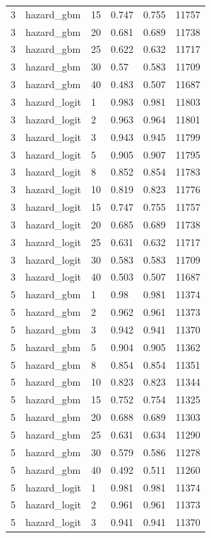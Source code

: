 \begin{tabular}{llllll}
3 & hazard\_gbm & 15 & 0.747 & 0.755 & 11757 \\
3 & hazard\_gbm & 20 & 0.681 & 0.689 & 11738 \\
3 & hazard\_gbm & 25 & 0.622 & 0.632 & 11717 \\
3 & hazard\_gbm & 30 & 0.57 & 0.583 & 11709 \\
3 & hazard\_gbm & 40 & 0.483 & 0.507 & 11687 \\
3 & hazard\_logit & 1 & 0.983 & 0.981 & 11803 \\
3 & hazard\_logit & 2 & 0.963 & 0.964 & 11801 \\
3 & hazard\_logit & 3 & 0.943 & 0.945 & 11799 \\
3 & hazard\_logit & 5 & 0.905 & 0.907 & 11795 \\
3 & hazard\_logit & 8 & 0.852 & 0.854 & 11783 \\
3 & hazard\_logit & 10 & 0.819 & 0.823 & 11776 \\
3 & hazard\_logit & 15 & 0.747 & 0.755 & 11757 \\
3 & hazard\_logit & 20 & 0.685 & 0.689 & 11738 \\
3 & hazard\_logit & 25 & 0.631 & 0.632 & 11717 \\
3 & hazard\_logit & 30 & 0.583 & 0.583 & 11709 \\
3 & hazard\_logit & 40 & 0.503 & 0.507 & 11687 \\
5 & hazard\_gbm & 1 & 0.98 & 0.981 & 11374 \\
5 & hazard\_gbm & 2 & 0.962 & 0.961 & 11373 \\
5 & hazard\_gbm & 3 & 0.942 & 0.941 & 11370 \\
5 & hazard\_gbm & 5 & 0.904 & 0.905 & 11362 \\
5 & hazard\_gbm & 8 & 0.854 & 0.854 & 11351 \\
5 & hazard\_gbm & 10 & 0.823 & 0.823 & 11344 \\
5 & hazard\_gbm & 15 & 0.752 & 0.754 & 11325 \\
5 & hazard\_gbm & 20 & 0.688 & 0.689 & 11303 \\
5 & hazard\_gbm & 25 & 0.631 & 0.634 & 11290 \\
5 & hazard\_gbm & 30 & 0.579 & 0.586 & 11278 \\
5 & hazard\_gbm & 40 & 0.492 & 0.511 & 11260 \\
5 & hazard\_logit & 1 & 0.981 & 0.981 & 11374 \\
5 & hazard\_logit & 2 & 0.961 & 0.961 & 11373 \\
5 & hazard\_logit & 3 & 0.941 & 0.941 & 11370 \\

\end{tabular}
